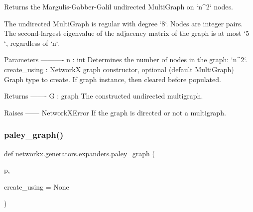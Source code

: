 \begin{DoxyVerb}Returns the Margulis-Gabber-Galil undirected MultiGraph on `n^2` nodes.

The undirected MultiGraph is regular with degree `8`. Nodes are integer
pairs. The second-largest eigenvalue of the adjacency matrix of the graph
is at most `5 `, regardless of `n`.

Parameters
----------
n : int
    Determines the number of nodes in the graph: `n^2`.
create_using : NetworkX graph constructor, optional (default MultiGraph)
   Graph type to create. If graph instance, then cleared before populated.

Returns
-------
G : graph
    The constructed undirected multigraph.

Raises
------
NetworkXError
    If the graph is directed or not a multigraph.\end{DoxyVerb}
 \mbox{\label{namespacenetworkx_1_1generators_1_1expanders_a3429b524be3e3562c2e3f2f60fc7dd0e}} 
\subsubsection{\texorpdfstring{paley\+\_\+graph()}{paley\_graph()}}
{\footnotesize\ttfamily def networkx.\+generators.\+expanders.\+paley\+\_\+graph (\begin{DoxyParamCaption}\item[{}]{p,  }\item[{}]{create\+\_\+using = {\ttfamily None} }\end{DoxyParamCaption})}

